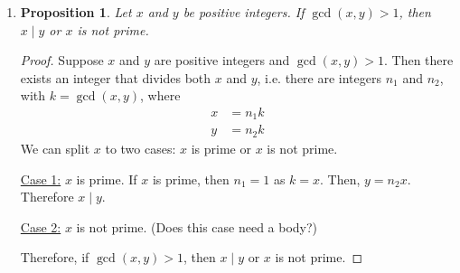 \documentclass{homework}
\newtheorem*{prop}{Proposition}
\begin{document}
\begin{enumerate}
\begin{minipage}[t]{\linewidth}
\begin{proof}
				Then by substitution, the sum $b+c$ can be written as \begin{align*}
					b+c & = k_1 a + k_2 a \\
						& = \left(k_1 + k_2\right) a \\
						& = k_3 a
				\end{align*}
				Since addition is closed on integers, $k_3 \in \mathbb{Z}$, $b+c$ can be written as an integer multiple of $a$.
				
				Therefore $a \mid \left(b+c\right)$.
			\end{proof}
		\end{minipage}
		
		\item \begin{minipage}[t]{\linewidth}
			\begin{prop}
				Let $x$ and $y$ be positive integers. If $\gcd(x, y) > 1$, then $x \mid y$ or $x$ is not prime.
			\end{prop}
			\begin{proof} Suppose $x$ and $y$ are positive integers and $\gcd(x, y) > 1$. Then there exists an integer that divides both $x$ and $y$, i.e. there are integers $n_1$ and $n_2$, with $k=\gcd(x, y)$, where \begin{align*}
				x & = n_1 k \\
				y & = n_2 k
			\end{align*}
			We can split $x$ to two cases: $x$ is prime or $x$ is not prime.
			
			\underline{Case 1:} $x$ is prime. If $x$ is prime, then $n_1 = 1$ as $k = x$. Then, $y = n_2 x$. Therefore $x \mid y$.
			
			\underline{Case 2:} $x$ is not prime. (Does this case need a body?)
			
			\vspace{1em}
			
			Therefore, if $\gcd(x, y) > 1$, then $x \mid y$ or $x$ is not prime.
			\end{proof}
		\end{minipage}
	

\end{enumerate}
\end{document}
